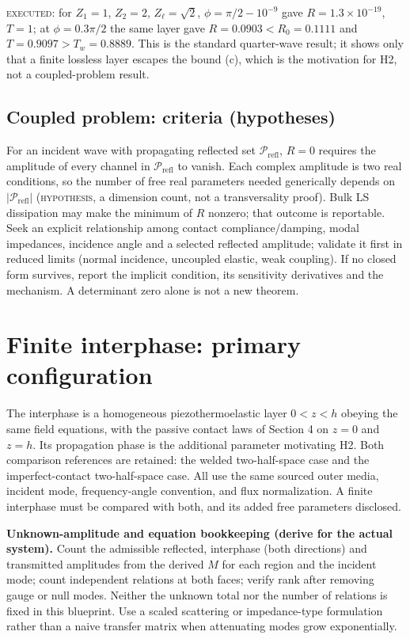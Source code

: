 \documentclass[11pt]{article}
\begin{document}
\textsc{executed}: for $Z_1=1$, $Z_2=2$, $Z_\ell=\sqrt2$, $\phi=\pi/2-10^{-9}$
gave $R=1.3\times10^{-19}$, $T=1$; at $\phi=0.3\pi/2$ the same layer gave
$R=0.0903<R_0=0.1111$ and $T=0.9097>T_w=0.8889$. This is the standard quarter-wave
result; it shows only that a finite lossless layer escapes the bound (c), which is
the motivation for H2, not a coupled-problem result.

\subsection{Coupled problem: criteria (hypotheses)}

For an incident wave with propagating reflected set $\mathcal{P}_{\text{refl}}$,
$R=0$ requires the amplitude of every channel in $\mathcal{P}_{\text{refl}}$ to
vanish. Each complex amplitude is two real conditions, so the number of free real
parameters needed generically depends on $\lvert\mathcal{P}_{\text{refl}}\rvert$
(\textsc{hypothesis}, a dimension count, not a transversality proof). Bulk LS
dissipation may make the minimum of $R$ nonzero; that outcome is reportable. Seek
an explicit relationship among contact compliance/damping, modal impedances,
incidence angle and a selected reflected amplitude; validate it first in reduced
limits (normal incidence, uncoupled elastic, weak coupling). If no closed form
survives, report the implicit condition, its sensitivity derivatives and the
mechanism. A determinant zero alone is not a new theorem.

\section{Finite interphase: primary configuration}

The interphase is a homogeneous piezothermoelastic layer $0<z<h$ obeying the same
field equations, with the passive contact laws of Section 4 on $z=0$ and $z=h$.
Its propagation phase is the additional parameter motivating H2. Both comparison
references are retained: the welded two-half-space case and the
imperfect-contact two-half-space case. All use the same sourced outer media,
incident mode, frequency-angle convention, and flux normalization. A finite
interphase must be compared with both, and its added free parameters disclosed.

\textbf{Unknown-amplitude and equation bookkeeping (derive for the actual
system).} Count the admissible reflected, interphase (both directions) and
transmitted amplitudes from the derived $M$ for each region and the incident mode;
count independent relations at both faces; verify rank after removing gauge or
null modes. Neither the unknown total nor the number of relations is fixed in this
blueprint. Use a scaled scattering or impedance-type formulation rather than a
naive transfer matrix when attenuating modes grow exponentially.
\end{document}
